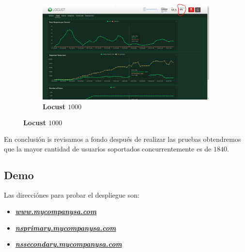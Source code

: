 \begin{figure}[H]
    \centering
    \begin{subfigure}[b]{0.8\textwidth}
        \centering
        \includegraphics[width=\textwidth]{Figures/0. General/locust_1000.png}
        \caption{\textbf{Locust $1000$}}
        \label{fig: Locust 1000}
    \end{subfigure}
\end{figure}

En conclusión is revisamos a fondo después de realizar las pruebas obtendremos
que la mayor cantidad de usuarios soportados concurrentemente es de $1840$.

\subsection{Demo}
Las direcciónes para probar el despliegue son:

\begin{itemize}
    \item \textbf{\textit{\url{www.mycompanysa.com}}}
    \item \textbf{\textit{\url{nsprimary.mycompanysa.com}}}
    \item \textbf{\textit{\url{nssecondary.mycompanysa.com}}}
\end{itemize}